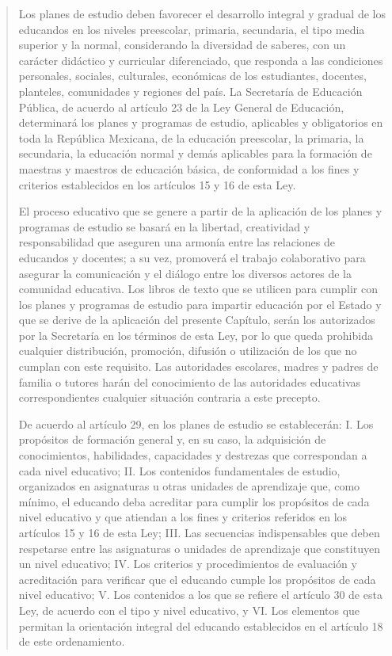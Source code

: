 \documentclass[
  12,
]{scrartcl}
\begin{document}
\begin{quote}
Los planes de estudio deben favorecer el desarrollo integral y gradual
de los educandos en los niveles preescolar, primaria, secundaria, el
tipo media superior y la normal, considerando la diversidad de saberes,
con un carácter didáctico y curricular diferenciado, que responda a las
condiciones personales, sociales, culturales, económicas de los
estudiantes, docentes, planteles, comunidades y regiones del país. La
Secretaría de Educación Pública, de acuerdo al artículo 23 de la Ley
General de Educación, determinará los planes y programas de estudio,
aplicables y obligatorios en toda la República Mexicana, de la educación
preescolar, la primaria, la secundaria, la educación normal y demás
aplicables para la formación de maestras y maestros de educación básica,
de conformidad a los fines y criterios establecidos en los artículos 15
y 16 de esta Ley.

El proceso educativo que se genere a partir de la aplicación de los
planes y programas de estudio se basará en la libertad, creatividad y
responsabilidad que aseguren una armonía entre las relaciones de
educandos y docentes; a su vez, promoverá el trabajo colaborativo para
asegurar la comunicación y el diálogo entre los diversos actores de la
comunidad educativa. Los libros de texto que se utilicen para cumplir
con los planes y programas de estudio para impartir educación por el
Estado y que se derive de la aplicación del presente Capítulo, serán los
autorizados por la Secretaría en los términos de esta Ley, por lo que
queda prohibida cualquier distribución, promoción, difusión o
utilización de los que no cumplan con este requisito. Las autoridades
escolares, madres y padres de familia o tutores harán del conocimiento
de las autoridades educativas correspondientes cualquier situación
contraria a este precepto.

De acuerdo al artículo 29, en los planes de estudio se establecerán: I.
Los propósitos de formación general y, en su caso, la adquisición de
conocimientos, habilidades, capacidades y destrezas que correspondan a
cada nivel educativo; II. Los contenidos fundamentales de estudio,
organizados en asignaturas u otras unidades de aprendizaje que, como
mínimo, el educando deba acreditar para cumplir los propósitos de cada
nivel educativo y que atiendan a los fines y criterios referidos en los
artículos 15 y 16 de esta Ley; III. Las secuencias indispensables que
deben respetarse entre las asignaturas o unidades de aprendizaje que
constituyen un nivel educativo; IV. Los criterios y procedimientos de
evaluación y acreditación para verificar que el educando cumple los
propósitos de cada nivel educativo; V. Los contenidos a los que se
refiere el artículo 30 de esta Ley, de acuerdo con el tipo y nivel
educativo, y VI. Los elementos que permitan la orientación integral del
educando establecidos en el artículo 18 de este ordenamiento.
\end{quote}
\end{document}
